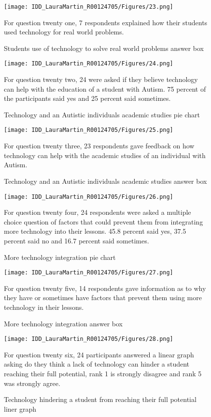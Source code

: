 \begin{figure}[ht]
\centering
\texttt{[image: IDD\_LauraMartin\_R00124705/Figures/23.png]}
\caption{Students use of technology to solve real world problems answer box}
{For question twenty one, 7 respondents explained how their students used technology for real world problems.}
\end{figure}

\begin{figure}[ht]
\centering
\texttt{[image: IDD\_LauraMartin\_R00124705/Figures/24.png]}
\caption{Technology and an Autistic individuals academic studies pie chart}
{For question twenty two, 24 were asked if they believe technology can help with the education of a student with Autism. 75 percent of the participants said yes and 25 percent said sometimes.}
\end{figure}

\begin{figure}[ht]
\centering
\texttt{[image: IDD\_LauraMartin\_R00124705/Figures/25.png]}
\caption{Technology and an Autistic individuals academic studies answer box}
{For question twenty three, 23 respondents gave feedback on how technology can help with the academic studies of an individual with Autism.}
\end{figure}

\begin{figure}[ht]
\centering
\texttt{[image: IDD\_LauraMartin\_R00124705/Figures/26.png]}
\caption{More technology integration pie chart}
{For question twenty four, 24 respondents were asked a multiple choice question of factors that could prevent them from integrating more technology into their lessons. 45.8 percent said yes, 37.5 percent said no and 16.7 percent said sometimes.}
\end{figure}

\begin{figure}[ht]
\centering
\texttt{[image: IDD\_LauraMartin\_R00124705/Figures/27.png]}
\caption{More technology integration answer box}
{For question twenty five, 14 respondents gave information as to why they have or sometimes have factors that prevent them using more technology in their lessons.}
\end{figure}

\begin{figure}[ht]
\centering
\texttt{[image: IDD\_LauraMartin\_R00124705/Figures/28.png]}
\caption{Technology hindering a student from reaching their full potential liner graph}
{For question twenty six, 24 participants answered a linear graph asking do they think a lack of technology can hinder a student reaching their full potential, rank 1 is strongly disagree and rank 5 was strongly agree.}
\end{figure}

